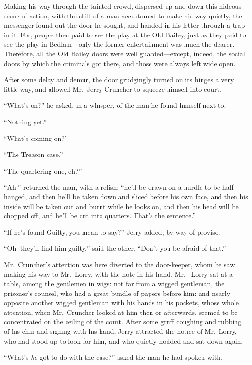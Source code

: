 Making his way through the tainted crowd, dispersed up and down this
hideous scene of action, with the skill of a man accustomed to make
his way quietly, the messenger found out the door he sought, and
handed in his letter through a trap in it.  For, people then paid to
see the play at the Old Bailey, just as they paid to see the play in
Bedlam---only the former entertainment was much the dearer. Therefore,
all the Old Bailey doors were well guarded---except, indeed, the
social doors by which the criminals got there, and those were always
left wide open.

After some delay and demur, the door grudgingly turned on its hinges
a very little way, and allowed Mr.\ Jerry Cruncher to squeeze himself
into court.

``What's on?'' he asked, in a whisper, of the man he found himself next to.

``Nothing yet.''

``What's coming on?''

``The Treason case.''

``The quartering one, eh?''

``Ah!'' returned the man, with a relish; ``he'll be drawn on a hurdle
to be half hanged, and then he'll be taken down and sliced before
his own face, and then his inside will be taken out and burnt while
he looks on, and then his head will be chopped off, and he'll be
cut into quarters.  That's the sentence.''

``If he's found Guilty, you mean to say?'' Jerry added, by way of proviso.

``Oh! they'll find him guilty,'' said the other.  ``Don't you be afraid of that.''

Mr.\ Cruncher's attention was here diverted to the door-keeper, whom
he saw making his way to Mr.\ Lorry, with the note in his hand.  Mr.\ %
Lorry sat at a table, among the gentlemen in wigs:  not far from a
wigged gentleman, the prisoner's counsel, who had a great bundle of
papers before him:  and nearly opposite another wigged gentleman with
his hands in his pockets, whose whole attention, when Mr.\ Cruncher
looked at him then or afterwards, seemed to be concentrated on the
ceiling of the court.  After some gruff coughing and rubbing of his
chin and signing with his hand, Jerry attracted the notice of
Mr.\ Lorry, who had stood up to look for him, and who quietly nodded
and sat down again.

``What's \emph{he} got to do with the case?'' asked the man he had spoken with.

